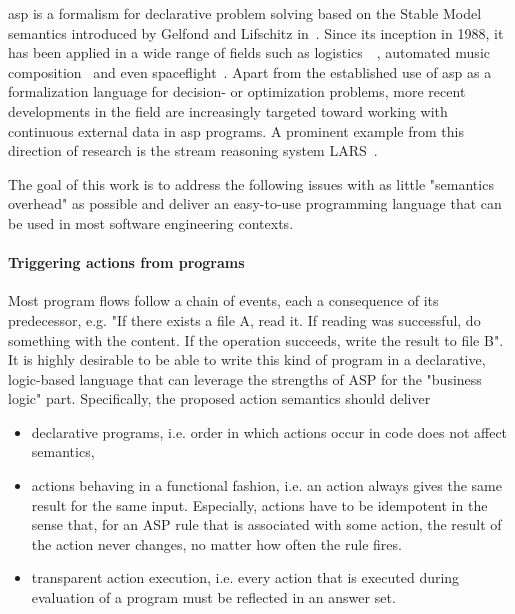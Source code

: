 \gls{asp} is a formalism for declarative problem solving based on the Stable Model semantics introduced by Gelfond and Lifschitz in~\cite{stable-models}. Since its inception in 1988, it has been applied in a wide range of fields such as logistics~\cite{gioia-tauro}~\cite{train-scheduling}, automated music composition~\cite{blues-composition} and even spaceflight~\cite{space-shuttle}. Apart from the established use of \gls{asp} as a formalization language for decision- or optimization problems, more recent developments in the field are increasingly targeted toward working with continuous external data in \gls{asp} programs. A prominent example from this direction of research is the stream reasoning system LARS~\cite{lars}.



The goal of this work is to address the following issues with as little "semantics overhead" as possible and deliver an easy-to-use programming language that can be used in most software engineering contexts.

\paragraph{Triggering actions from programs} \label{goals:actions}Most program flows follow a chain of events, each a consequence of its predecessor, e.g. "If there exists a file A, read it. If reading was successful, do something with the content. If the operation succeeds, write the result to file B". It is highly desirable to be able to write this kind of program in a declarative, logic-based language that can leverage the strengths of ASP for the "business logic" part. Specifically, the proposed action semantics should deliver
\begin{itemize}
    \item declarative programs, i.e. order in which actions occur in code does not affect semantics,
    \item actions behaving in a functional fashion, i.e. an action always gives the same result for the same input. Especially, actions have to be idempotent in the sense that, for an ASP rule that is associated with some action, the result of the action never changes, no matter how often the rule fires.
    \item transparent action execution, i.e. every action that is executed during evaluation of a program must be reflected in an answer set.
\end{itemize}

